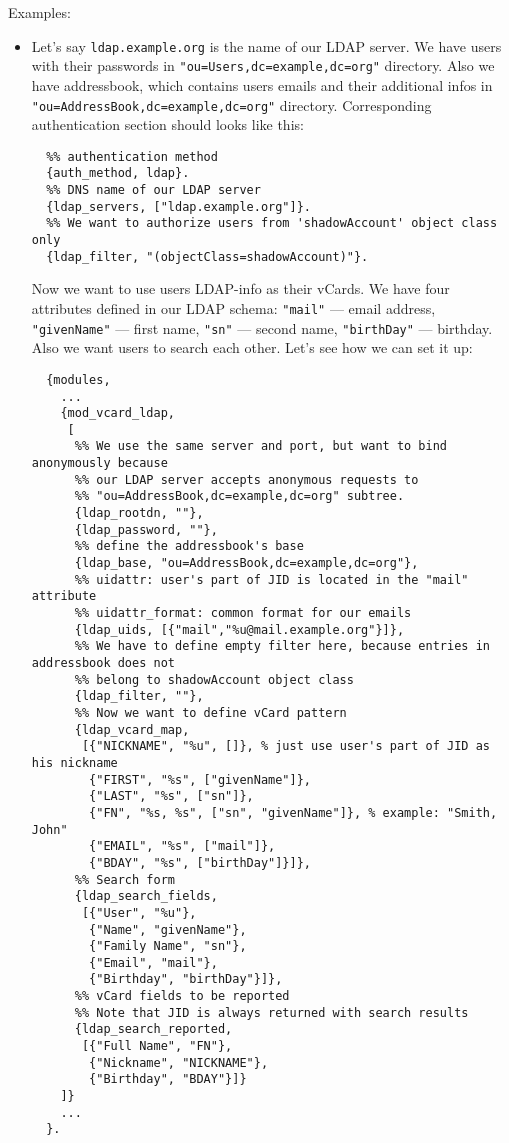\documentclass[a4paper,10pt]{book}
\newcommand{\term}[1]{\texttt{#1}}
\begin{document}
Examples:
\begin{itemize}
\item 

Let's say \term{ldap.example.org} is the name of our LDAP server. We have
users with their passwords in \term{"ou=Users,dc=example,dc=org"} directory.
Also we have addressbook, which contains users emails and their additional
infos in \term{"ou=AddressBook,dc=example,dc=org"} directory.  Corresponding
authentication section should looks like this:

\begin{verbatim}
  %% authentication method
  {auth_method, ldap}.
  %% DNS name of our LDAP server
  {ldap_servers, ["ldap.example.org"]}.
  %% We want to authorize users from 'shadowAccount' object class only
  {ldap_filter, "(objectClass=shadowAccount)"}.
\end{verbatim}

Now we want to use users LDAP-info as their vCards. We have four attributes
defined in our LDAP schema: \term{"mail"} --- email address, \term{"givenName"}
--- first name, \term{"sn"} --- second name, \term{"birthDay"} --- birthday.
Also we want users to search each other. Let's see how we can set it up:

\begin{verbatim}
  {modules,
    ...
    {mod_vcard_ldap,
     [
      %% We use the same server and port, but want to bind anonymously because
      %% our LDAP server accepts anonymous requests to
      %% "ou=AddressBook,dc=example,dc=org" subtree.
      {ldap_rootdn, ""},
      {ldap_password, ""},
      %% define the addressbook's base
      {ldap_base, "ou=AddressBook,dc=example,dc=org"},
      %% uidattr: user's part of JID is located in the "mail" attribute
      %% uidattr_format: common format for our emails
      {ldap_uids, [{"mail","%u@mail.example.org"}]},
      %% We have to define empty filter here, because entries in addressbook does not
      %% belong to shadowAccount object class
      {ldap_filter, ""},
      %% Now we want to define vCard pattern
      {ldap_vcard_map,
       [{"NICKNAME", "%u", []}, % just use user's part of JID as his nickname
        {"FIRST", "%s", ["givenName"]},
        {"LAST", "%s", ["sn"]},
        {"FN", "%s, %s", ["sn", "givenName"]}, % example: "Smith, John"
        {"EMAIL", "%s", ["mail"]},
        {"BDAY", "%s", ["birthDay"]}]},
      %% Search form
      {ldap_search_fields,
       [{"User", "%u"},
        {"Name", "givenName"},
        {"Family Name", "sn"},
        {"Email", "mail"},
        {"Birthday", "birthDay"}]},
      %% vCard fields to be reported
      %% Note that JID is always returned with search results
      {ldap_search_reported,
       [{"Full Name", "FN"},
        {"Nickname", "NICKNAME"},
        {"Birthday", "BDAY"}]}
    ]}
    ...
  }.
\end{verbatim}


\end{itemize}
\end{document}

